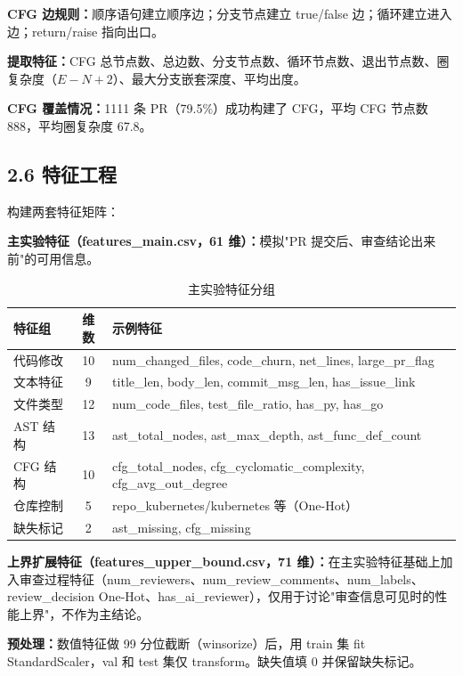 \documentclass{experimentreport}
\begin{document}
{\textbf{CFG 边规则：}顺序语句建立顺序边；分支节点建立 true/false 边；循环建立进入边；return/raise 指向出口。

\textbf{提取特征：}CFG 总节点数、总边数、分支节点数、循环节点数、退出节点数、圈复杂度（$E - N + 2$）、最大分支嵌套深度、平均出度。

\textbf{CFG 覆盖情况：}1111 条 PR（79.5\%）成功构建了 CFG，平均 CFG 节点数 888，平均圈复杂度 67.8。

\subsection*{2.6 特征工程}

构建两套特征矩阵：

\textbf{主实验特征（features\_main.csv，61 维）：}模拟"PR 提交后、审查结论出来前"的可用信息。

\begin{table}[ht]
\centering
\caption{主实验特征分组}
\begin{tabular}{|l|c|l|}
\hline
\textbf{特征组} & \textbf{维数} & \textbf{示例特征} \\
\hline
代码修改 & 10 & num\_changed\_files, code\_churn, net\_lines, large\_pr\_flag \\
\hline
文本特征 & 9 & title\_len, body\_len, commit\_msg\_len, has\_issue\_link \\
\hline
文件类型 & 12 & num\_code\_files, test\_file\_ratio, has\_py, has\_go \\
\hline
AST 结构 & 13 & ast\_total\_nodes, ast\_max\_depth, ast\_func\_def\_count \\
\hline
CFG 结构 & 10 & cfg\_total\_nodes, cfg\_cyclomatic\_complexity, cfg\_avg\_out\_degree \\
\hline
仓库控制 & 5 & repo\_kubernetes/kubernetes 等（One-Hot） \\
\hline
缺失标记 & 2 & ast\_missing, cfg\_missing \\
\hline
\end{tabular}
\end{table}

\textbf{上界扩展特征（features\_upper\_bound.csv，71 维）：}在主实验特征基础上加入审查过程特征（num\_reviewers、num\_review\_comments、num\_labels、review\_decision One-Hot、has\_ai\_reviewer），仅用于讨论"审查信息可见时的性能上界"，不作为主结论。

\textbf{预处理：}数值特征做 99 分位截断（winsorize）后，用 train 集 fit StandardScaler，val 和 test 集仅 transform。缺失值填 0 并保留缺失标记。

}
\end{document}
